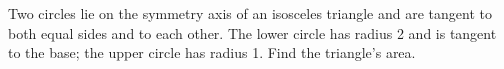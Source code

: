 Two circles lie on the symmetry axis of an isosceles triangle and are tangent to both equal sides and to each other. The lower circle has radius 2 and is tangent to the base; the upper circle has radius 1. Find the triangle's area.

